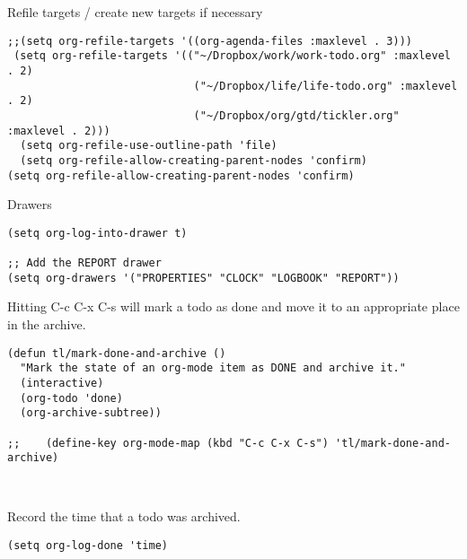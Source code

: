 \documentclass[12pt]{article}
\begin{document}
Refile targets / create new targets if necessary

\lstset{language=Lisp,label= ,caption= ,captionpos=b,numbers=none}
\begin{lstlisting}
;;(setq org-refile-targets '((org-agenda-files :maxlevel . 3)))
 (setq org-refile-targets '(("~/Dropbox/work/work-todo.org" :maxlevel . 2)
                             ("~/Dropbox/life/life-todo.org" :maxlevel . 2)
                             ("~/Dropbox/org/gtd/tickler.org" :maxlevel . 2)))
  (setq org-refile-use-outline-path 'file)
  (setq org-refile-allow-creating-parent-nodes 'confirm)
(setq org-refile-allow-creating-parent-nodes 'confirm)
\end{lstlisting}

Drawers 
\lstset{language=Lisp,label= ,caption= ,captionpos=b,numbers=none}
\begin{lstlisting}
(setq org-log-into-drawer t)

;; Add the REPORT drawer
(setq org-drawers '("PROPERTIES" "CLOCK" "LOGBOOK" "REPORT"))
\end{lstlisting}

Hitting C-c C-x C-s will mark a todo as done and move it to an appropriate place
in the archive.

\lstset{language=Lisp,label= ,caption= ,captionpos=b,numbers=none}
\begin{lstlisting}
(defun tl/mark-done-and-archive ()
  "Mark the state of an org-mode item as DONE and archive it."
  (interactive)
  (org-todo 'done)
  (org-archive-subtree))

;;    (define-key org-mode-map (kbd "C-c C-x C-s") 'tl/mark-done-and-archive)



\end{lstlisting}

Record the time that a todo was archived.

\lstset{language=Lisp,label= ,caption= ,captionpos=b,numbers=none}
\begin{lstlisting}
(setq org-log-done 'time)
\end{lstlisting}
\end{document}
